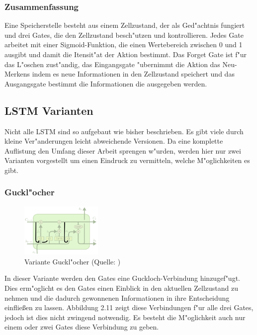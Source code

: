 {\subsubsection{Zusammenfassung}
Eine Speicherstelle besteht aus einem Zellzustand, der als Ged"achtnis fungiert und drei Gates, die den Zellzustand besch"utzen und kontrollieren. Jedes Gate arbeitet mit einer Sigmoid-Funktion, die einen Wertebereich zwischen 0 und 1 ausgibt und damit die Itensit"at der Aktion bestimmt. Das Forget Gate ist f"ur das L"oschen zust"andig, das Eingangsgate "ubernimmt die Aktion das Neu-Merkens indem es neue Informationen in den Zellzustand speichert und das Ausgangsgate bestimmt die Informationen die ausgegeben werden.


\subsection{LSTM Varianten}
Nicht alle LSTM sind so aufgebaut wie bisher beschrieben. Es gibt viele durch kleine Ver"anderungen leicht abweichende Versionen. Da eine komplette Auflistung den Umfang dieser Arbeit sprengen w"urden, werden hier nur zwei Varianten vorgestellt um einen Eindruck zu vermitteln, welche M"oglichkeiten es gibt.

\subsubsection{Guckl"ocher}
\begin{figure}
  \vspace{-40pt}
  \begin{center}
    \includegraphics[width=0.35\textwidth]{pictures/LSTM3-var-peepholes_cut.png}
  \end{center}
  \vspace{-20pt}
  \caption[LSTM Variante: Guckl"ocher]{Variante Guckl"ocher (Quelle: \cite{OlahImg})}
\vspace{-10pt}
\end{figure}
In dieser Variante werden den Gates eine Guckloch-Verbindung hinzugef"ugt. Dies erm"oglicht es den Gates einen Einblick in den aktuellen Zellzustand zu nehmen und die dadurch gewonnenen Informationen in ihre Entscheidung einflie{\ss}en zu lassen. Abbildung 2.11 zeigt diese Verbindungen f"ur alle drei Gates, jedoch ist dies nicht zwingend notwendig. Es besteht die M"oglichkeit auch nur einem oder zwei Gates diese Verbindung zu geben.

}
